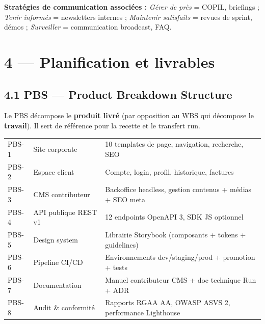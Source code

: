 \documentclass[11pt,a4paper,oneside]{report}
\begin{document}
\textbf{Stratégies de communication associées :} \emph{Gérer de près} = COPIL, briefings ; \emph{Tenir informés} = newsletters internes ; \emph{Maintenir satisfaits} = revues de sprint, démos ; \emph{Surveiller} = communication broadcast, FAQ.

\newpage
\section*{4 --- Planification et livrables}

\subsection*{4.1 PBS --- Product Breakdown Structure}

Le PBS décompose le \textbf{produit livré} (par opposition au WBS qui décompose le \textbf{travail}). Il sert de référence pour la recette et le transfert run.

\renewcommand{\arraystretch}{1.3}
\begin{tabularx}{\textwidth}{C{1.5cm} L{4cm} Y}
\toprule
{} &  &  \\
\midrule
PBS-1 & Site corporate                & 10 templates de page, navigation, recherche, SEO \\
PBS-2 & Espace client                 & Compte, login, profil, historique, factures \\
PBS-3 & CMS contributeur              & Backoffice headless, gestion contenus + médias + SEO meta \\
PBS-4 & API publique REST v1          & 12 endpoints OpenAPI 3, SDK JS optionnel \\
PBS-5 & Design system                 & Librairie Storybook (composants + tokens + guidelines) \\
PBS-6 & Pipeline CI/CD                & Environnements dev/staging/prod + promotion + tests \\
PBS-7 & Documentation                 & Manuel contributeur CMS + doc technique Run + ADR \\
PBS-8 & Audit \& conformité           & Rapports RGAA AA, OWASP ASVS 2, performance Lighthouse \\
\bottomrule
\end{tabularx}
\end{document}
